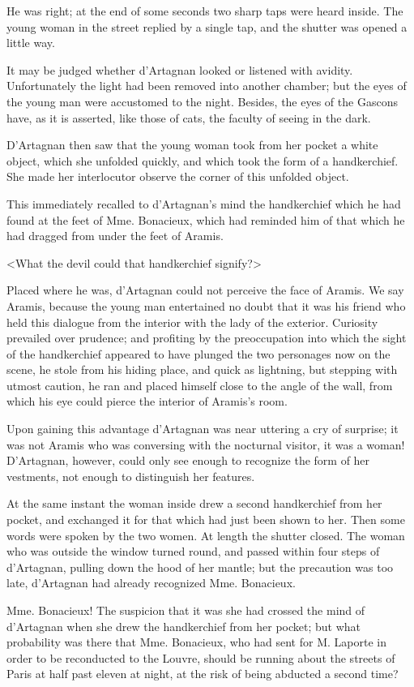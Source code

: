 He was right; at the end of some seconds two sharp taps were heard inside. The young woman in the street replied by a single tap, and the shutter was opened a little way. 

It may be judged whether d'Artagnan looked or listened with avidity. Unfortunately the light had been removed into another chamber; but the eyes of the young man were accustomed to the night. Besides, the eyes of the Gascons have, as it is asserted, like those of cats, the faculty of seeing in the dark. 

D'Artagnan then saw that the young woman took from her pocket a white object, which she unfolded quickly, and which took the form of a handkerchief. She made her interlocutor observe the corner of this unfolded object. 

This immediately recalled to d'Artagnan's mind the handkerchief which he had found at the feet of Mme. Bonacieux, which had reminded him of that which he had dragged from under the feet of Aramis. 

<What the devil could that handkerchief signify?> 

Placed where he was, d'Artagnan could not perceive the face of Aramis. We say Aramis, because the young man entertained no doubt that it was his friend who held this dialogue from the interior with the lady of the exterior. Curiosity prevailed over prudence; and profiting by the preoccupation into which the sight of the handkerchief appeared to have plunged the two personages now on the scene, he stole from his hiding place, and quick as lightning, but stepping with utmost caution, he ran and placed himself close to the angle of the wall, from which his eye could pierce the interior of Aramis's room. 

Upon gaining this advantage d'Artagnan was near uttering a cry of surprise; it was not Aramis who was conversing with the nocturnal visitor, it was a woman! D'Artagnan, however, could only see enough to recognize the form of her vestments, not enough to distinguish her features. 

At the same instant the woman inside drew a second handkerchief from her pocket, and exchanged it for that which had just been shown to her. Then some words were spoken by the two women. At length the shutter closed. The woman who was outside the window turned round, and passed within four steps of d'Artagnan, pulling down the hood of her mantle; but the precaution was too late, d'Artagnan had already recognized Mme. Bonacieux. 

Mme. Bonacieux! The suspicion that it was she had crossed the mind of d'Artagnan when she drew the handkerchief from her pocket; but what probability was there that Mme. Bonacieux, who had sent for M. Laporte in order to be reconducted to the Louvre, should be running about the streets of Paris at half past eleven at night, at the risk of being abducted a second time? 

